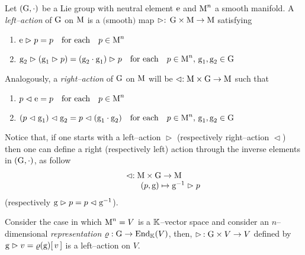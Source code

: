\begin{defi}[$\G$--action]
    Let $(\G,\cdot)$ be a Lie group with neutral element $\e$ and $\M^n$ a smooth manifold. A \emph{left--action} of $\G$ on $\M$ is a $($smooth$)$ map $\vartriangleright:\,\G\times\M\to\M$ satisfying 
    \begin{enumerate}[$i)$]
        \item $\e\vartriangleright p=p \quad\text{for each}\quad p\in\M^n$
        \item $\g_2\vartriangleright(\g_1\vartriangleright p)=(\g_2\cdot \g_1)\vartriangleright p \quad\text{for each}\quad p\in\M^n,\,\g_1,\g_2\in\G $
    \end{enumerate}
    Analogously, a \emph{right--action} of $\G$ on $\M$ will be $\vartriangleleft:\M\times\G\to\M$ such that 
    \begin{enumerate}[$i)$]
        \item $p\vartriangleleft\e=p\quad\text{for each}\quad p\in\M^n$
        \item $(p\vartriangleleft\g_1)\vartriangleleft\g_2=p\vartriangleleft(\g_1\cdot\g_2)\quad\text{for each}\quad p\in\M^n,\,\g_1,\g_2\in\G $
    \end{enumerate}
\end{defi}

Notice that, if one starts with a left--action $\vartriangleright$ (respectively right--action $\vartriangleleft$) then one can define a right (respectively left) action through the inverse elements in $(\G,\cdot)$, as follow
$$\begin{matrix}
    \vartriangleleft:\M\times\G\to\M\\
    \qquad\qquad(p,\g)\mapsto\g^{-1}\vartriangleright p
\end{matrix}$$
(respectively $\g\vartriangleright p=p\vartriangleleft\g^{-1}$).
\begin{example}\label{representation}
    Consider the case in which $\M^n=V$ is a $\K$--vector space and consider an $n$--dimensional \emph{representation} $\varrho:\G\to\End_\K(V)$, then, $\vartriangleright\,:\G\times V\to V$ defined by $\g\vartriangleright v=\varrho(\g)[\,v\,]$ is a left--action on $V$.
\end{example}



